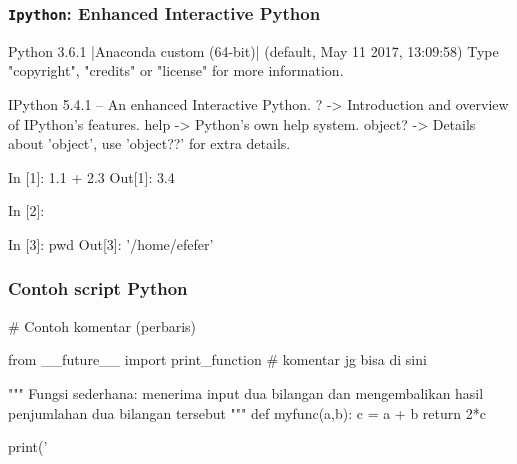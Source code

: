 \documentclass[bahasa,10pt]{beamer}
\begin{document}
\begin{frame}[fragile]
\frametitle{\texttt{Ipython}: Enhanced Interactive Python}

\begin{textcode}
Python 3.6.1 |Anaconda custom (64-bit)| (default, May 11 2017, 13:09:58) 
Type "copyright", "credits" or "license" for more information.

IPython 5.4.1 -- An enhanced Interactive Python.
?         -> Introduction and overview of IPython's features.
help      -> Python's own help system.
object?   -> Details about 'object', use 'object??' for extra details.

In [1]: 1.1 + 2.3
Out[1]: 3.4

In [2]: %

In [3]: pwd
Out[3]: '/home/efefer'
\end{textcode}

\end{frame}



\begin{frame}[fragile]
\frametitle{Contoh script Python}

\begin{pythoncode}
# Contoh komentar (perbaris)

from __future__ import print_function # komentar jg bisa di sini

"""
Fungsi sederhana: menerima input dua bilangan dan mengembalikan
hasil penjumlahan dua bilangan tersebut
"""
def myfunc(a,b):
    c = a + b
    return 2*c

print('%
\end{pythoncode}


\end{frame}
\end{document}
